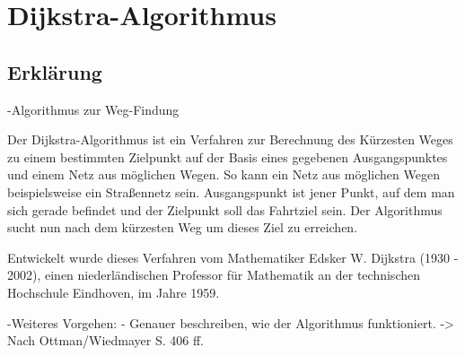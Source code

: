 \chapter{Dijkstra-Algorithmus}

\section{Erklärung}

-Algorithmus zur Weg-Findung

Der Dijkstra-Algorithmus ist ein Verfahren zur Berechnung des Kürzesten Weges zu einem bestimmten Zielpunkt auf der Basis eines gegebenen Ausgangspunktes und einem Netz aus möglichen Wegen.
So kann ein Netz aus möglichen Wegen beispielsweise ein Straßennetz sein.
Ausgangspunkt ist jener Punkt, auf dem man sich gerade befindet und der Zielpunkt soll das Fahrtziel sein.
Der Algorithmus sucht nun nach dem kürzesten Weg um dieses Ziel zu erreichen.

Entwickelt wurde dieses Verfahren vom Mathematiker Edsker W. Dijkstra (1930 - 2002), einen niederländischen Professor für Mathematik an der technischen Hochschule Eindhoven, im Jahre 1959.



-Weiteres Vorgehen:
	- Genauer beschreiben, wie der Algorithmus funktioniert.
		-> Nach Ottman/Wiedmayer S. 406 ff.
		
